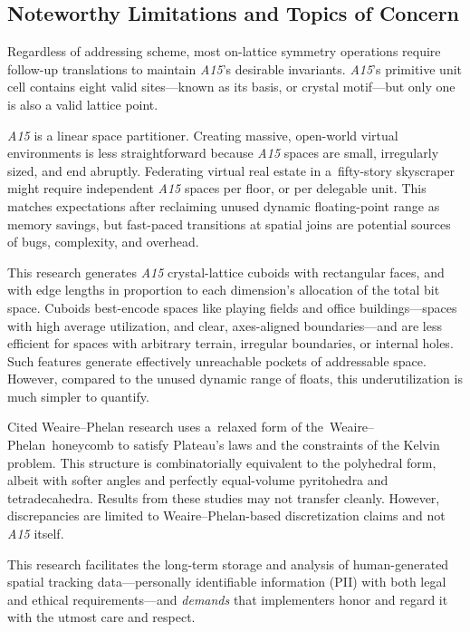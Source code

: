 \documentclass[10pt]{article}
\def\AAAB{\textit{A15}}
\def\WP{Weaire--Phelan} \def\WPH{Weaire--Phelan~Honeycomb} \def\TWPh{The~Weaire--Phelan~honeycomb}
\def\tWPh{the~Weaire--Phelan~honeycomb}
\begin{document}
\subsection{ Noteworthy Limitations and Topics of Concern }\label{noteworthy-limitations-and-topics-of-concern}

Regardless of addressing scheme, most on-lattice symmetry operations require follow-up translations to maintain \AAAB's desirable
invariants. \AAAB{}'s primitive unit cell contains eight valid sites---known as its basis, or crystal motif---but only one is
also a valid lattice point.

\AAAB{} is a linear space partitioner. Creating massive, open-world virtual environments is less straightforward because \AAAB{}
spaces are small, irregularly sized, and end abruptly. Federating virtual real estate in a~fifty-story skyscraper might require
independent \AAAB{} spaces per floor, or per delegable unit. This matches expectations after reclaiming unused dynamic
floating-point range as memory savings, but fast-paced transitions at spatial joins are potential sources of bugs, complexity,
and overhead.

This research generates \AAAB{} crystal-lattice cuboids with rectangular faces, and with edge lengths in proportion to each
dimension's allocation of the total bit space. Cuboids best-encode spaces like playing fields and office buildings---spaces with
high average utilization, and clear, axes-aligned boundaries---and are less efficient for spaces with arbitrary terrain,
irregular boundaries, or internal holes. Such features generate effectively unreachable pockets of addressable space. However,
compared to the unused dynamic range of floats, this underutilization is much simpler to quantify.

Cited \WP{} research uses a~relaxed form of \tWPh{} to satisfy Plateau's laws and the constraints of the Kelvin problem. This
structure is combinatorially equivalent to the polyhedral form, albeit with softer angles and perfectly equal-volume pyritohedra
and tetradecahedra. Results from these studies may not transfer cleanly. However, discrepancies are limited to \WP-based
discretization claims and not \AAAB{} itself.

This research facilitates the long-term storage and analysis of human-generated spatial tracking data---personally identifiable
information (PII) with both legal and ethical requirements---and \emph{demands} that implementers honor and regard it with the
utmost care and respect.
\end{document}
